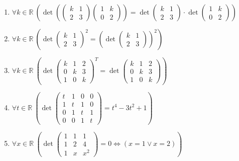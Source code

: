 \documentclass[11pt,a4paper]{article}
\begin{document}
\begin{enumerate}
\item $\displaystyle \forall k \in \mathbb{R}\ \left( \det\left( \begin{pmatrix} k & 1 \\ 2 & 3 \end{pmatrix} \begin{pmatrix} 1 & k \\ 0 & 2 \end{pmatrix} \right) = \det \begin{pmatrix} k & 1 \\ 2 & 3 \end{pmatrix} \cdot \det \begin{pmatrix} 1 & k \\ 0 & 2 \end{pmatrix} \right)$
\item $\displaystyle \forall k \in \mathbb{R}\ \left( \det \begin{pmatrix} k & 1 \\ 2 & 3 \end{pmatrix}^{2} = \left( \det \begin{pmatrix} k & 1 \\ 2 & 3 \end{pmatrix} \right)^{2} \right)$
\item $\displaystyle \forall k \in \mathbb{R}\ \left( \det \begin{pmatrix} k & 1 & 2 \\ 0 & k & 3 \\ 1 & 0 & k \end{pmatrix}^{T} = \det \begin{pmatrix} k & 1 & 2 \\ 0 & k & 3 \\ 1 & 0 & k \end{pmatrix} \right)$
\item $\displaystyle \forall t \in \mathbb{R}\ \left( \det \begin{pmatrix} t & 1 & 0 & 0 \\ 1 & t & 1 & 0 \\ 0 & 1 & t & 1 \\ 0 & 0 & 1 & t \end{pmatrix} = t^{4} - 3t^{2} + 1 \right)$
\item $\displaystyle \forall x \in \mathbb{R}\ \left( \det \begin{pmatrix} 1 & 1 & 1 \\ 1 & 2 & 4 \\ 1 & x & x^{2} \end{pmatrix} = 0 \iff \left( x = 1 \lor x = 2 \right) \right)$

\end{enumerate}
\end{document}
